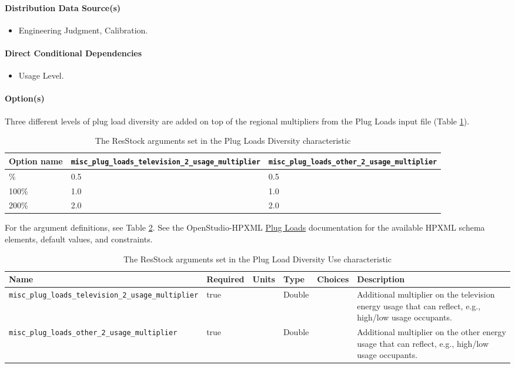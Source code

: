 \paragraph{Distribution Data Source(s)}
\begin{itemize}
 
\item
  Engineering Judgment, Calibration.
\end{itemize}
\paragraph{Direct Conditional Dependencies}
\begin{itemize}
    \item Usage Level.
\end{itemize}
\paragraph{Option(s)}
Three different levels of plug load diversity are added on top of the regional multipliers from the Plug Loads input file (Table \ref{table:hc_opt_plug_load_diversity}). 

\begin{longtable}[]{|p{2.5cm}|p{4.5cm}|p{4.5cm}|} \caption{The ResStock arguments set in the Plug Loads Diversity characteristic} \label{table:hc_opt_plug_load_diversity}  \\
\toprule\noalign{}
Option name &
\texttt{misc\_plug\_loads\_television\_2\_usage\_multiplier} &
\texttt{misc\_plug\_loads\_other\_2\_usage\_multiplier} \\
\midrule\noalign{}
\endhead
\bottomrule\noalign{}
\endlastfoot
50\% & 0.5 & 0.5 \\
100\% & 1.0 & 1.0 \\
200\% & 2.0 & 2.0 \\
\end{longtable}
For the argument definitions, see Table \ref{table:hc_arg_def_plug_load_diversity}. See the OpenStudio-HPXML \href{https://openstudio-hpxml.readthedocs.io/en/v1.8.1/workflow_inputs.html#hpxml-plug-loads}{Plug Loads} documentation for the available HPXML schema elements, default values, and constraints.

\begin{longtable}[]{|p{}|p{1.5cm}|p{1.3cm}|p{1.1cm}|p{}|p{}|} \caption{The ResStock arguments set in the Plug Load Diversity Use characteristic} \label{table:hc_arg_def_plug_load_diversity}  \\
\toprule\noalign{}
Name & Required & Units & Type & Choices & Description \\
\midrule\noalign{}
\endhead
\bottomrule\noalign{}
\endlastfoot
\texttt{misc\_plug\_loads\_television\_2\_usage\_multiplier} & true & &
Double & & Additional multiplier on the television energy usage that can
reflect, e.g., high/low usage occupants. \\
\hline
\texttt{misc\_plug\_loads\_other\_2\_usage\_multiplier} & true & &
Double & & Additional multiplier on the other energy usage that can
reflect, e.g., high/low usage occupants. \\
\end{longtable}



